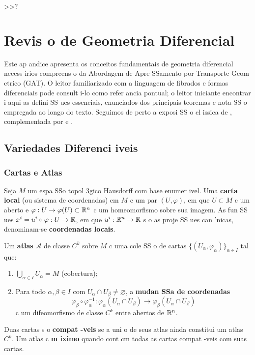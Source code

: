  >>?\chapter{Revis o de Geometria Diferencial}
\label{apx:geometria}

Este ap andice apresenta os conceitos fundamentais de geometria diferencial necess irios compreens o da Abordagem de Apre SSamento por Transporte Geom ctrico (GAT). O leitor familiarizado com a linguagem de fibrados e formas diferenciais pode consult i-lo como refer ancia pontual; o leitor iniciante encontrar i aqui as defini SS ues essenciais, enunciados dos principais teoremas e nota SS o empregada ao longo do texto. Seguimos de perto a exposi SS o cl issica de , complementada por  e .

\section{Variedades Diferenci iveis}
\label{sec:variedades}

\subsection{Cartas e Atlas}

\begin{defi}
Seja $M$ um espa SSo topol 3gico Hausdorff com base enumer ivel. Uma \textbf{carta local} (ou sistema de coordenadas) em $M$ c um par $(U,\varphi)$, em que $U\subset M$ c um aberto e $\varphi:U\to\varphi(U)\subset\mathbb{R}^n$ c um homeomorfismo sobre sua imagem. As fun SS ues $x^i = u^i\circ\varphi:U\to\mathbb{R}$, em que $u^i:\mathbb{R}^n\to\mathbb{R}$ s o as proje SS ues can 'nicas, denominam-se \textbf{coordenadas locais}.
\end{defi}

\begin{defi}[Atlas]
Um \textbf{atlas} $\mathcal{A}$ de classe $C^k$ sobre $M$ c uma cole SS o de cartas $\{(U_\alpha,\varphi_\alpha)\}_{\alpha\in I}$ tal que:
\begin{enumerate}
 \item $\bigcup_{\alpha\in I}U_\alpha = M$ (cobertura);
 \item Para todo $\alpha,\beta\in I$ com $U_\alpha\cap U_\beta\neq\varnothing$, a \textbf{mudan SSa de coordenadas}
 \begin{equation}
 \varphi_\beta\circ\varphi_\alpha^{-1}:\varphi_\alpha(U_\alpha\cap U_\beta)\to\varphi_\beta(U_\alpha\cap U_\beta)
 \end{equation}
 c um difeomorfismo de classe $C^k$ entre abertos de $\mathbb{R}^n$.
\end{enumerate}
Duas cartas s o \textbf{compat -veis} se a uni o de seus atlas ainda constitui um atlas $C^k$. Um atlas c \textbf{m iximo} quando cont cm todas as cartas compat -veis com suas cartas.
\end{defi}

